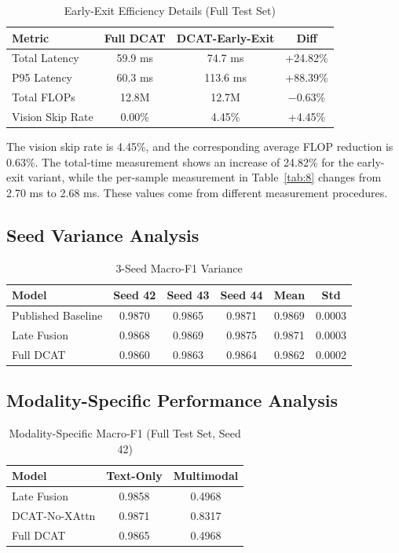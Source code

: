 \documentclass[conference]{IEEEtran}
\begin{document}
\begin{table}[htbp]
\centering
\renewcommand{\arraystretch}{1.2}
\caption{Early-Exit Efficiency Details (Full Test Set)}
\label{tab:9}
\begin{tabular}{lccc}
\toprule
Metric & Full DCAT & DCAT-Early-Exit & Diff \\
\midrule
Total Latency & 59.9 ms & 74.7 ms & +24.82\% \\
P95 Latency & 60.3 ms & 113.6 ms & +88.39\% \\
Total FLOPs & 12.8M & 12.7M & $-$0.63\% \\
Vision Skip Rate & 0.00\% & 4.45\% & +4.45\% \\
\bottomrule
\end{tabular}
\end{table}

The vision skip rate is 4.45\%, and the corresponding average FLOP reduction is 0.63\%. The total-time measurement shows an increase of 24.82\% for the early-exit variant, while the per-sample measurement in Table~\ref{tab:8} changes from 2.70 ms to 2.68 ms. These values come from different measurement procedures.

\subsection{Seed Variance Analysis}

\begin{table}[htbp]
\centering
\renewcommand{\arraystretch}{1.2}
\caption{3-Seed Macro-F1 Variance}
\label{tab:10}
\begin{tabular}{lccccc}
\toprule
Model & Seed 42 & Seed 43 & Seed 44 & Mean & Std \\
\midrule
Published Baseline & 0.9870 & 0.9865 & 0.9871 & 0.9869 & 0.0003 \\
Late Fusion & 0.9868 & 0.9869 & 0.9875 & 0.9871 & 0.0003 \\
Full DCAT & 0.9860 & 0.9863 & 0.9864 & 0.9862 & 0.0002 \\
\bottomrule
\end{tabular}
\end{table}

\subsection{Modality-Specific Performance Analysis}

\begin{table}[htbp]
\centering
\renewcommand{\arraystretch}{1.2}
\caption{Modality-Specific Macro-F1 (Full Test Set, Seed 42)}
\label{tab:11}
\begin{tabular}{lcc}
\toprule
Model & Text-Only & Multimodal \\
\midrule
Late Fusion & 0.9858 & 0.4968 \\
DCAT-No-XAttn & 0.9871 & 0.8317 \\
Full DCAT & 0.9865 & 0.4968 \\
\bottomrule
\end{tabular}
\end{table}
\end{document}
